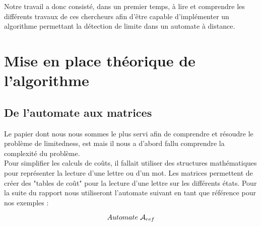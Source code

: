 \documentclass{report}
\begin{document}
Notre travail a donc consisté, dans un premier temps, à lire et comprendre les différents travaux de ces chercheurs afin d'être capable d'implémenter un algorithme permettant la détection de limite dans un automate à distance.

\part{Mise en place théorique de l'algorithme}

\chapter{De l'automate aux matrices}

Le papier dont nous nous sommes le plus servi afin de comprendre et résoudre le problème de limitedness, est \cite{Simon:Semigroups-Matrices-over-Tropical:1994:a} mais il nous a d'abord fallu comprendre la complexité du problème.\\
Pour simplifier les calculs de coûts, il fallait utiliser des structures mathématiques pour représenter la lecture d'une lettre ou d'un mot. Les matrices permettent de créer des "tables de coût" pour la lecture d'une lettre sur les différents états. Pour la suite du rapport nous utiliseront l'automate suivant en tant que référence pour nos exemples :\\

\begin{center}
\[ Automate\; \mathcal{A}_{ref}\]
\end{center}
\end{document}
